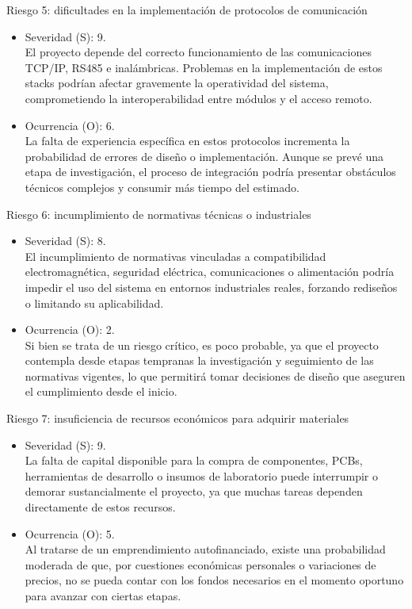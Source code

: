 \documentclass[
11pt, %
]{charter}
\begin{document}
Riesgo 5: dificultades en la implementación de protocolos de comunicación
\begin{itemize}
	\item Severidad (S):  9.\\	El proyecto depende del correcto funcionamiento de las comunicaciones TCP/IP, RS485 e inalámbricas. Problemas en la implementación de estos stacks podrían afectar gravemente la operatividad del sistema, comprometiendo la interoperabilidad entre módulos y el acceso remoto.
	\item Ocurrencia (O): 6.\\	La falta de experiencia específica en estos protocolos incrementa la probabilidad de errores de diseño o implementación. Aunque se prevé una etapa de investigación, el proceso de integración podría presentar obstáculos técnicos complejos y consumir más tiempo del estimado.
\end{itemize}

Riesgo 6: incumplimiento de normativas técnicas o industriales
\begin{itemize}
	\item Severidad (S):  8.\\	El incumplimiento de normativas vinculadas a compatibilidad electromagnética, seguridad eléctrica, comunicaciones o alimentación podría impedir el uso del sistema en entornos industriales reales, forzando rediseños o limitando su aplicabilidad.
	\item Ocurrencia (O): 2.\\	Si bien se trata de un riesgo crítico, es poco probable, ya que el proyecto contempla desde etapas tempranas la investigación y seguimiento de las normativas vigentes, lo que permitirá tomar decisiones de diseño que aseguren el cumplimiento desde el inicio.
\end{itemize}

Riesgo 7: insuficiencia de recursos económicos para adquirir materiales
\begin{itemize}
	\item Severidad (S):  9.\\	La falta de capital disponible para la compra de componentes, PCBs, herramientas de desarrollo o insumos de laboratorio puede interrumpir o demorar sustancialmente el proyecto, ya que muchas tareas dependen directamente de estos recursos.
	\item Ocurrencia (O): 5.\\	Al tratarse de un emprendimiento autofinanciado, existe una probabilidad moderada de que, por cuestiones económicas personales o variaciones de precios, no se pueda contar con los fondos necesarios en el momento oportuno para avanzar con ciertas etapas.
\end{itemize}
\end{document}
